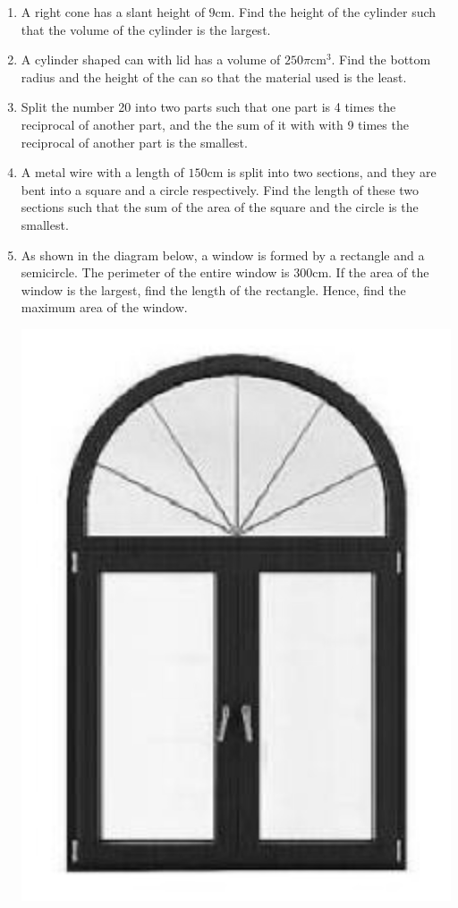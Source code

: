 \begin{enumerate}
    \item A right cone has a slant height of $9$cm. Find the height of the cylinder such
          that the volume of the cylinder is the largest.
    \item A cylinder shaped can with lid has a volume of $250\pi$cm$^3$. Find the bottom
          radius and the height of the can so that the material used is the least.
    \item Split the number 20 into two parts such that one part is 4 times the reciprocal
          of another part, and the the sum of it with with 9 times the reciprocal of
          another part is the smallest.
    \item A metal wire with a length of $150$cm is split into two sections, and they are
          bent into a square and a circle respectively. Find the length of these two
          sections such that the sum of the area of the square and the circle is the
          smallest.
    \item As shown in the diagram below, a window is formed by a rectangle and a
          semicircle. The perimeter of the entire window is 300cm. If the area of the
          window is the largest, find the length of the rectangle. Hence, find the
          maximum area of the window.
          \begin{center}
              \includegraphics[scale=0.25]{assets/26-10.png}

\end{center}
\end{enumerate}
